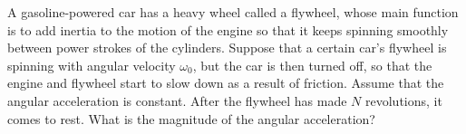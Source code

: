 A gasoline-powered car has a heavy wheel called a flywheel, whose main function
is to add inertia to the motion of the engine so that it keeps spinning smoothly
between power strokes of the cylinders.
Suppose that a certain car's flywheel is spinning with
angular velocity $\omega_0$, but the car is then turned off, so that the
engine and flywheel start to slow down as a result of friction. Assume that the
angular acceleration is constant. After the flywheel
has made $N$ revolutions, it comes to rest. What is the magnitude of
the angular acceleration?
